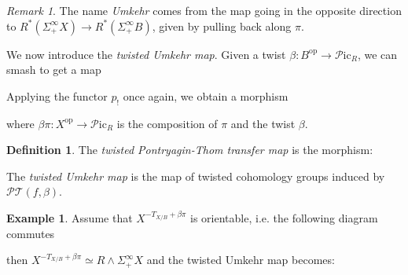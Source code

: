 \documentclass[a4paper]{book}
\newcommand{\lP}{\mathcal{P}}
\newcommand{\bS}{\mathbb{S}}
\newcommand{\lT}{\mathcal{T}}
\newcommand{\op}{\mathrm{op}}
\newcommand{\Pic}{\lP\mathrm{ic}} %
\newcommand{\PT}{\lP\lT} %
\theoremstyle{definition}
\newtheorem{definition}[equation]{Definition}
\newtheorem{example}[equation]{Example}
\theoremstyle{remark}
\newtheorem{remark}[equation]{Remark}
\numberwithin{equation}{section}
\begin{document}
\begin{remark}
	The name \emph{Umkehr} comes from the map going in the opposite direction to $R^*(\Sigma^\infty_+X)\to R^*(\Sigma^\infty_+B)$, given by pulling back along $\pi$. 
\end{remark}
We now introduce the \emph{twisted Umkehr map}. Given a twist $\beta\colon B^{\op} \to \Pic_R$, we can smash to get a map 
\begin{center}
\end{center}
Applying the functor $p_!$ once again, we obtain a morphism \begin{center}
\end{center}
where $\beta\pi:X^{\op}\to\Pic_R$ is the composition of $\pi$ and the twist $\beta$.
\begin{definition}
	The \emph{twisted Pontryagin-Thom transfer map} is the morphism:
	\begin{center}
	\end{center}The \emph{twisted Umkehr map} is the map of twisted cohomology groups induced by $\PT(f,\beta)$. 
\end{definition}
\begin{example}
	Assume that $X^{-T_{X/B}+\beta\pi}$ is orientable, i.e. the following diagram commutes \begin{center} 
	\end{center}then $X^{-T_{X/B}+\beta\pi}\simeq R\wedge\Sigma^\infty_+X$ and the twisted Umkehr map becomes:
	\begin{center}
	\end{center}
\end{example}
\end{document}
